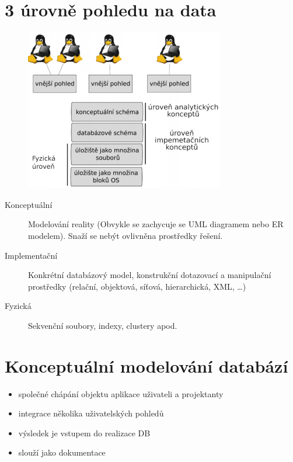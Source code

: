 \documentclass{szzclass}
\begin{document}
\tableofcontents
\newpage

\section{3 úrovně pohledu na data}
\begin{figure}[h!]
  \centering
  \includegraphics[width = \textwidth]{topics/bi-spol-11/images/views.png}
\end{figure}
\begin{description}
  \item[Konceptuální] Modelování reality (Obvykle se zachycuje se UML diagramem nebo ER modelem). Snaží se nebýt ovlivněna prostředky řešení.
  \item[Implementační] Konkrétní databázový model, konstrukční dotazovací a manipulační prostředky (relační, objektová, síťová, hierarchická, XML, \dots)
  \item[Fyzická] Sekvenční soubory, indexy, clustery apod.
\end{description}

\section{Konceptuální modelování databází}
\begin{itemize}
  \item společné chápání objektu aplikace uživateli a projektanty
  \item integrace několika uživatelských pohledů
  \item výsledek je vstupem do realizace DB
  \item slouží jako dokumentace
\end{itemize}
\end{document}
